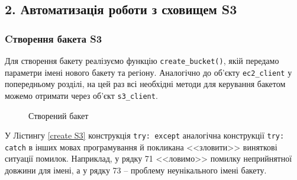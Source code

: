 \documentclass[a4paper,14pt]{extarticle} %
\begin{document}
\subsection*{2. Автоматизація роботи з сховищем S3}

\subsubsection*{Cтворення бакета S3}

Для створення бакету реалізуємо функцію \texttt{create\_bucket()}, якій передамо параметри імені нового бакету 
та регіону. Аналогічно до об'єкту \texttt{ec2\_client} у попередньому розділі, на цей раз всі необхідні методи 
для керування бакетом можемо отримати через об'єкт \texttt{s3\_client}.



\begin{figure}[H]
    \begin{minipage}[H]{1\linewidth}
    \end{minipage}
    \vfill
    \begin{minipage}[H]{1\linewidth}
        \caption{Створений бакет}
        \label{fig:S3:create a bucket}
    \end{minipage}
\end{figure}

У Лістингу \ref{create S3} конструкція \texttt{try: except} аналогічна конструкції \texttt{try: catch} в 
інших мовах програмування й покликана <<зловити>> виняткові ситуації помилок. Наприклад, у рядку 71 <<ловимо>> 
помилку неприйнятної довжини для імені, а у рядку 73 -- проблему неунікального імені бакету. 
\end{document}
